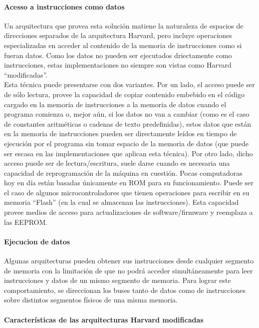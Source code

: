\paragraph{Acesso a instrucciones como datos}

Un arquitectura que provea esta solución matiene la naturaleza de espacios de direcciones separados de la arquitectura Harvard, pero incluye operaciones especializadas en acceder al contenido de la memoria de instrucciones como si fueran datos. Como los datos no pueden ser ejecutados driectamente como instrucciones, estas implementaciones no siempre son vistas como Harvard ``modificadas''.\\
Esta técnica puede presentarse con dos variantes. Por un lado, el acceso puede ser de sólo lectura, provee la capacidad de copiar contenido embebido en el código cargado en la memoria de instrucciones a la memoria de datos cuando el programa comienza o, mejor aún, si los datos no van a cambiar (como es el caso de constantes aritméticas o cadenas de texto predefinidas), estos datos que están en la memoria de instrucciones pueden ser directamente leídos en tiempo de ejecución por el programa sin tomar espacio de la memoria de datos (que puede ser escasa en las implementaciones que aplican esta técnica). Por otro lado, dicho acceso puede ser de lectura/escritura, suele darse cuando es necesaria una capacidad de reprogramación de la máquina en cuestión. Pocas computadoras hoy en día están basadas únicamente en ROM para su funcionamiento. Puede ser el caso de algunos microcontroladores que tienen operaciones para escribir en su memoria ``Flash'' (en la cual se almacenan las instrucciones). Esta capacidad provee medios de acceso para actualizaciones de software/firmware y reemplaza a las EEPROM.

\paragraph{Ejecucion de datos}

Algunas arquitecturas pueden obtener sus instrucciones desde cualquier segmento de memoria con la limitación de que no podrá acceder simultáneamente para leer instrucciones y datos de un mismo segmento de memoria. Para lograr este comportamiento, se direccionan los buses tanto de datos como de instrucciones sobre distintos segmentos físicos de una misma memoria.

\paragraph{Características de las arquitecturas Harvard modificadas}

